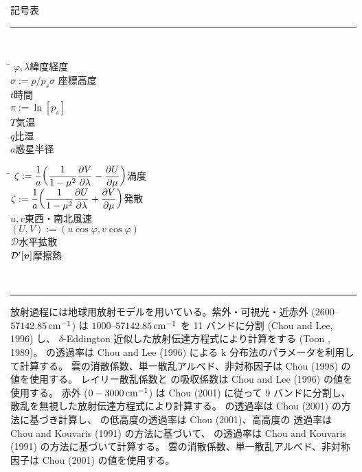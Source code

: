 \documentclass[body]{subfiles}
\begin{document}
\begin{table}[t]
	\centering
	\caption{記号表}\label{記号表}
	\begin{minipage}{.8\textwidth}
		\rule[0pt]{\textwidth}{\heavyrulewidth}\\
		\begin{minipage}{.5\textwidth}
			\hfill
			\begin{tabbing}
				\hspace*{3\zw}\=\kill
				\(\varphi,\lambda\)\>緯度経度\\
				\(\sigma:=p/p_s\)\quad\(\sigma\) 座標高度\\
				\(t\)\>時間\\
				\(\pi:=\ln[p_s]\)\\
				\(T\)\>気温\\
				\(q\)\>比湿\\
				\(a\)\>惑星半径\\
			\end{tabbing}
		\end{minipage}
		\hfill
		\begin{minipage}{.5\textwidth}
			\hfill
			\begin{tabbing}
				\hspace*{3\zw}\=\kill
				\(\displaystyle\zeta:=\frac{1}{a}\qty(\frac{1}{1-\mu^2}\pdv{V}{\lambda}-\pdv{U}{\mu})\)\quad 渦度\\
				\(\displaystyle\zeta:=\frac{1}{a}\qty(\frac{1}{1-\mu^2}\pdv{U}{\lambda}+\pdv{V}{\mu})\)\quad 発散\\
				\(u,v\)\>東西・南北風速\\
				\((U,V):=(u\cos\varphi,v\cos\varphi)\)\\
				\(\mathcal{D}\)\>水平拡散\\
				\(\mathcal{D}'[\vb*{v}]\)\>摩擦熱
			\end{tabbing}
		\end{minipage}\\
		\rule[0pt]{\textwidth}{\heavyrulewidth}
	\end{minipage}
\end{table}

放射過程には地球用放射モデルを用いている。紫外・可視光・近赤外 (\(2600\)--\(57142.85\hmu{cm^{-1}}\))
は \(1000\)--\(57142.85\hmu{cm^{-1}}\) を 11 バンドに分割 (Chou and Lee, 1996) し、
\(\delta\)-Eddington 近似した放射伝達方程式により計算をする (Toon \etal*, 1989)。
 の透過率は Chou and Lee (1996) による k 分布法のパラメータを利用して計算する。
雲の消散係数、単一散乱アルベド、非対称因子は Chou \etal (1998) の値を使用する。
レイリー散乱係数と  の吸収係数は Chou and Lee (1996) の値を使用する。
赤外 (\(0-3000\hmu{cm^{-1}}\)) は Chou \etal (2001) に従って 9 バンドに分割し、
散乱を無視した放射伝達方程式により計算する。 の透過率は Chou \etal (2001)
の方法に基づき計算し、 の低高度の透過率は Chou \etal (2001)、高高度の
透過率は Chou and Kouvaris (1991) の方法に基づいて、 の透過率は
Chou and Kouvaris (1991) の方法に基づいて計算する。
雲の消散係数、単一散乱アルベド、非対称因子は Chou \etal (2001) の値を使用する。
\end{document}
